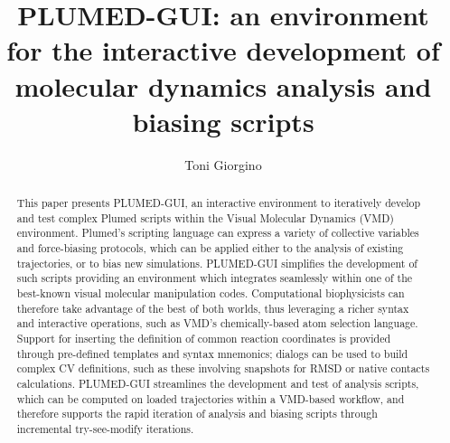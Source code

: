 \documentclass[preprint,12pt]{elsarticle}
\newcommand{\mytitle}{PLUMED-GUI: an environment for the interactive development 
  of molecular dynamics analysis and biasing scripts}
\begin{document}
\begin{frontmatter}


\title{\mytitle}
\author{Toni Giorgino}
\address{Institute of Biomedical Engineering (ISIB),\\ 
National Research Council of Italy (CNR),\\
Padua, Italy}




\begin{abstract}
  This paper presents PLUMED-GUI, an interactive environment to
  iteratively develop and test complex Plumed scripts within the
  Visual Molecular Dynamics (VMD) environment. Plumed's scripting
  language can express a variety of collective variables and
  force-biasing protocols, which can be applied either to the analysis
  of existing trajectories, or to bias new simulations. PLUMED-GUI
  simplifies the development of such scripts providing an environment
  which integrates seamlessly within one of the best-known visual
  molecular manipulation codes. Computational biophysicists can
  therefore take advantage of the best of both worlds, thus leveraging
  a richer syntax and interactive operations, such as VMD's
  chemically-based atom selection language.  Support for inserting the
  definition of common reaction coordinates is provided through
  pre-defined templates and syntax mnemonics; dialogs can be used to
  build complex CV definitions, such as these involving snapshots for
  RMSD or native contacts calculations.  PLUMED-GUI streamlines the
  development and test of analysis scripts, which can be computed on
  loaded trajectories within a VMD-based workflow, and therefore
  supports the rapid iteration of analysis and biasing scripts through
  incremental try-see-modify iterations.
\end{abstract}


\end{frontmatter}
\end{document}
